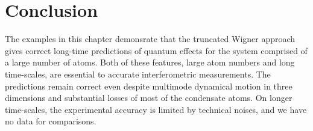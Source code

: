 \section{Conclusion}

The examples in this chapter demonsrate that the truncated Wigner approach gives correct long-time predictions of quantum effects for the system comprised of a large number of atoms.
Both of these features, large atom numbers and long time-scales, are essential to accurate interferometric measurements.
The predictions remain correct even despite multimode dynamical motion in three dimensions and substantial losses of most of the condensate atoms.
On longer time-scales, the experimental accuracy is limited by technical noises, and we have no data for comparisons.
